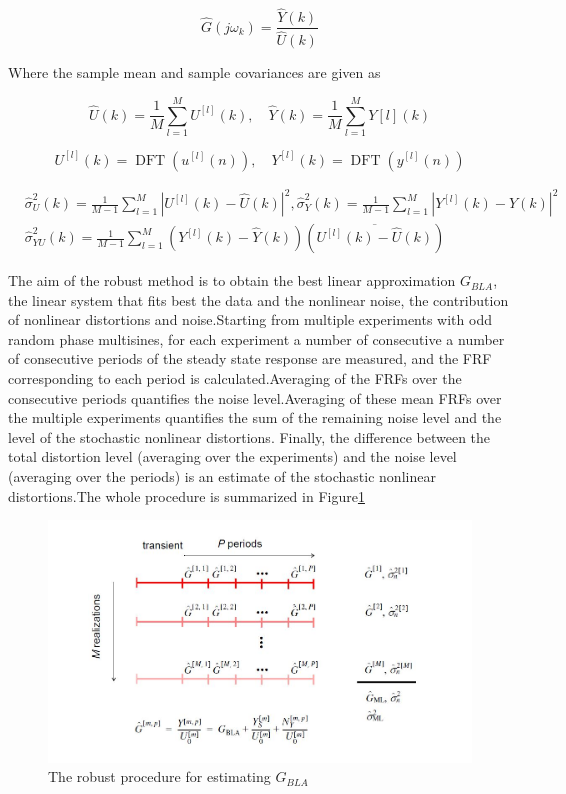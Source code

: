 \documentclass[a4paper,12pt]{report}
\numberwithin{equation}{section}
\begin{document}
\begin{equation}
\hat{G}\left(j \omega_{k}\right)=\frac{\hat{Y}(k)}{\hat{U}(k)}
\end{equation}

\noindent
Where the sample mean and sample covariances are given as

$$
\hat{U}(k)=\frac{1}{M} \sum_{l=1}^{M} U^{[l]}(k), \quad \hat{Y}(k)=\frac{1}{M} \sum_{l=1}^{M} Y[l](k)
$$

$$
U^{[l]}(k)=\operatorname{DFT}\left(u^{[l]}(n)\right), \quad Y^{[l]}(k)=\operatorname{DFT}\left(y^{[l]}(n)\right)
$$

\begin{equation}\label{eq:covar}
\begin{aligned}
&\hat{\sigma}_{U}^{2}(k)=\frac{1}{M-1} \sum_{l=1}^{M}\left|U^{[l]}(k)-\hat{U}(k)\right|^{2}, \hat{\sigma}_{Y}^{2}(k)=\frac{1}{M-1} \sum_{l=1}^{M}\left|Y^{[l]}(k)-\hat{Y}(k)\right|^{2} \\
&\hat{\sigma}_{Y U}^{2}(k)=\frac{1}{M-1} \sum_{l=1}^{M}\left(Y^{[l]}(k)-\hat{Y}(k)\right)\left(\overline{U^{[l]}(k)-\hat{U}(k)}\right)
\end{aligned}
\end{equation}

The aim of the robust method is to obtain the best linear approximation $G_{BLA}$, the linear system that fits best the data and the nonlinear noise, the contribution of nonlinear distortions and noise.Starting from multiple experiments with odd random phase multisines, for each experiment a number of consecutive a number of consecutive periods of the steady state response are measured, and the FRF corresponding to each period is calculated.Averaging of the FRFs over the consecutive periods quantifies the noise level.Averaging of these mean FRFs over the multiple experiments quantifies the sum of the remaining noise level and the level of the stochastic nonlinear distortions. Finally, the difference between the total distortion level (averaging over the experiments) and the noise level (averaging over the periods) is an estimate of the stochastic nonlinear distortions.The whole
procedure is summarized in Figure\ref{fig:robust procedure}

\begin{figure}[H]
    \includegraphics[scale=0.9]{robust_procedure.JPG}
    \centering
    \caption{The robust procedure for estimating $G_{BLA}$}
    \label{fig:robust procedure}
\end{figure}
\end{document}
